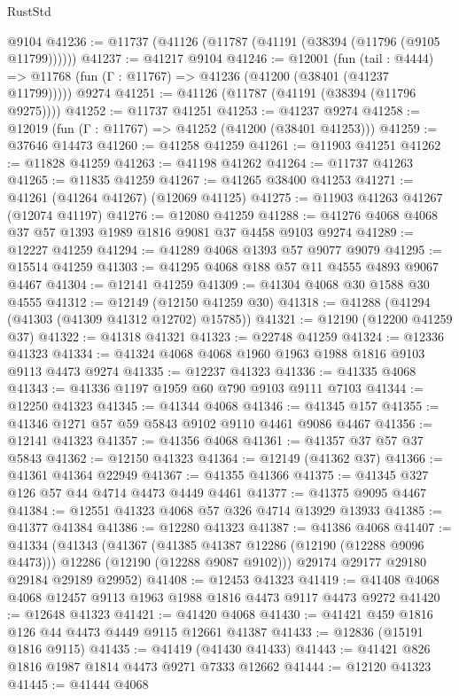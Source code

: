 \begin{lexlean}{RustStd}
\begin{coremodule}
    @9104
@41236 := @11737 (@41126 (@11787 (@41191 (@38394 (@11796 (@9105 @11799))))))
@41237 := @41217 @9104
@41246 := @12001
    (fun (tail : @4444) => @11768 (fun (Γ : @11767) => @41236 (@41200 (@38401 (@41237 @11799)))))
    @9274
@41251 := @41126 (@11787 (@41191 (@38394 (@11796 @9275))))
@41252 := @11737 @41251
@41253 := @41237 @9274
@41258 := @12019 (fun (Γ : @11767) => @41252 (@41200 (@38401 @41253)))
@41259 := @37646 @14473
@41260 := @41258 @41259
@41261 := @11903 @41251
@41262 := @11828 @41259
@41263 := @41198 @41262
@41264 := @11737 @41263
@41265 := @11835 @41259
@41267 := @41265 @38400 @41253
@41271 := @41261 (@41264 @41267) (@12069 @41125)
@41275 := @11903 @41263 @41267 (@12074 @41197)
@41276 := @12080 @41259
@41288 := @41276 @4068 @4068 @37 @57 @1393 @1989 @1816 @9081 @37 @4458 @9103 @9274
@41289 := @12227 @41259
@41294 := @41289 @4068 @1393 @57 @9077 @9079
@41295 := @15514 @41259
@41303 := @41295 @4068 @188 @57 @11 @4555 @4893 @9067 @4467
@41304 := @12141 @41259
@41309 := @41304 @4068 @30 @1588 @30 @4555
@41312 := @12149 (@12150 @41259 @30)
@41318 := @41288 (@41294 (@41303 (@41309 @41312 @12702) @15785))
@41321 := @12190 (@12200 @41259 @37)
@41322 := @41318 @41321
@41323 := @22748 @41259
@41324 := @12336 @41323
@41334 := @41324 @4068 @4068 @1960 @1963 @1988 @1816 @9103 @9113 @4473 @9274
@41335 := @12237 @41323
@41336 := @41335 @4068
@41343 := @41336 @1197 @1959 @60 @790 @9103 @9111 @7103
@41344 := @12250 @41323
@41345 := @41344 @4068
@41346 := @41345 @157
@41355 := @41346 @1271 @57 @59 @5843 @9102 @9110 @4461 @9086 @4467
@41356 := @12141 @41323
@41357 := @41356 @4068
@41361 := @41357 @37 @57 @37 @5843
@41362 := @12150 @41323
@41364 := @12149 (@41362 @37)
@41366 := @41361 @41364 @22949
@41367 := @41355 @41366
@41375 := @41345 @327 @126 @57 @44 @4714 @4473 @4449 @4461
@41377 := @41375 @9095 @4467
@41384 := @12551 @41323 @4068 @57 @326 @4714 @13929 @13933
@41385 := @41377 @41384
@41386 := @12280 @41323
@41387 := @41386 @4068
@41407 := @41334
    (@41343
      (@41367
        (@41385 @41387 @12286 (@12190 (@12288 @9096 @4473)))
        @12286
        (@12190 (@12288 @9087 @9102)))
      @29174
      @29177
      @29180
      @29184
      @29189
      @29952)
@41408 := @12453 @41323
@41419 := @41408 @4068 @4068 @12457 @9113 @1963 @1988 @1816 @4473 @9117 @4473 @9272
@41420 := @12648 @41323
@41421 := @41420 @4068
@41430 := @41421 @459 @1816 @126 @44 @4473 @4449 @9115 @12661 @41387
@41433 := @12836 (@15191 @1816 @9115)
@41435 := @41419 (@41430 @41433)
@41443 := @41421 @826 @1816 @1987 @1814 @4473 @9271 @7333 @12662
@41444 := @12120 @41323
@41445 := @41444 @4068

\end{coremodule}
\end{lexlean}
